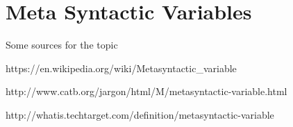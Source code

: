 \documentclass[proposal.tex]{subfiles}
\begin{document}
\section{Meta Syntactic Variables}\label{sect:metasyntacticvariables}

Some sources for the topic 

https://en.wikipedia.org/wiki/Metasyntactic_variable

http://www.catb.org/jargon/html/M/metasyntactic-variable.html

http://whatis.techtarget.com/definition/metasyntactic-variable
\end{document}
